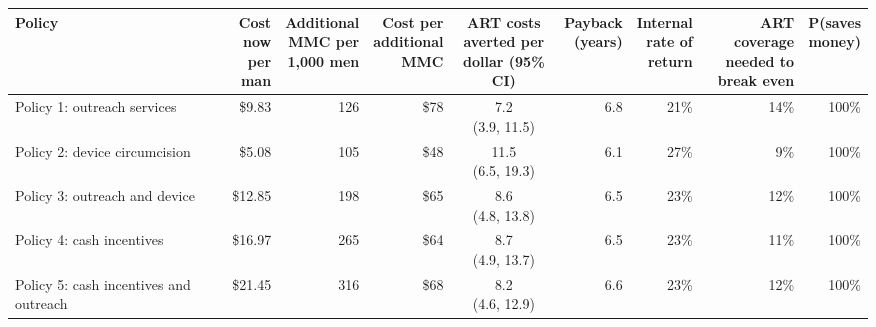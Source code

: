 \begin{tabular}{>{\raggedright\arraybackslash}p{3.0cm}rrrcrrrr}
\toprule
Policy & \makecell{Cost now\\per man} & \makecell{Additional\\MMC per\\1,000 men} & \makecell{Cost per\\additional\\MMC} & \makecell{ART costs\\averted per\\dollar (95\% CI)} & \makecell{Payback\\(years)} & \makecell{Internal\\rate of\\return} & \makecell{ART coverage\\needed to\\break even} & \makecell{P(saves\\money)}
\\
\midrule
Policy 1: outreach services & \$9.83 & 126 & \$78 & \makecell{7.2\\(3.9, 11.5)} & 6.8 & 21\% & 14\% & 100\% \\
Policy 2: device circumcision & \$5.08 & 105 & \$48 & \makecell{11.5\\(6.5, 19.3)} & 6.1 & 27\% & 9\% & 100\% \\
Policy 3: outreach and device & \$12.85 & 198 & \$65 & \makecell{8.6\\(4.8, 13.8)} & 6.5 & 23\% & 12\% & 100\% \\
Policy 4: cash incentives & \$16.97 & 265 & \$64 & \makecell{8.7\\(4.9, 13.7)} & 6.5 & 23\% & 11\% & 100\% \\
Policy 5: cash incentives and outreach & \$21.45 & 316 & \$68 & \makecell{8.2\\(4.6, 12.9)} & 6.6 & 23\% & 12\% & 100\% \\
\bottomrule
\end{tabular}
